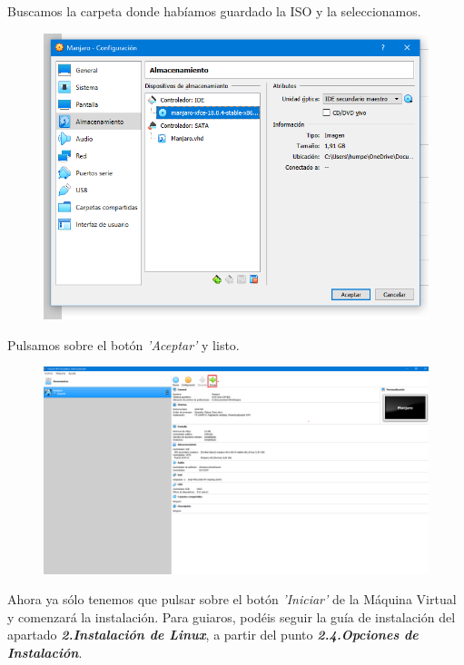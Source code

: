 \newline \noindent Buscamos la carpeta donde habíamos guardado la ISO y la seleccionamos.
\begin{figure}[H]
        \centering
        \includegraphics[width= 0.7 \textwidth]{Media/VB11.png}
    \end{figure}
\newline \noindent Pulsamos sobre el botón \textit{'Aceptar'} y listo.
\begin{figure}[H]
        \centering
        \includegraphics[width= 0.7 \textwidth]{Media/VB12.png}
    \end{figure}
\newline \noindent Ahora ya sólo tenemos que pulsar sobre el botón \textit{'Iniciar'} de la Máquina Virtual y comenzará la instalación. Para guiaros, podéis seguir la guía de instalación del apartado \textbf{\textit{2.Instalación de Linux}}, a partir del punto \textbf{\textit{2.4.Opciones de Instalación}}.
